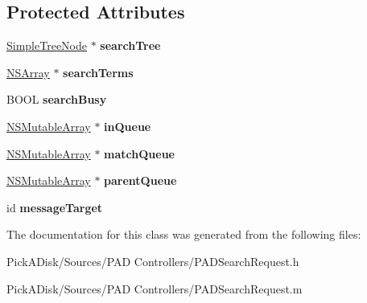 \subsection*{Protected Attributes}
\begin{DoxyCompactItemize}
\item 
\hypertarget{interface_p_a_d_search_term_operation_a9cb714370ce604571ce9d9e484323752}{
\hyperlink{class_simple_tree_node}{SimpleTreeNode} $\ast$ {\bfseries searchTree}}
\label{interface_p_a_d_search_term_operation_a9cb714370ce604571ce9d9e484323752}

\item 
\hypertarget{interface_p_a_d_search_term_operation_aa08f06e64d4f09f6c751c209901f5ca0}{
\hyperlink{class_n_s_array}{NSArray} $\ast$ {\bfseries searchTerms}}
\label{interface_p_a_d_search_term_operation_aa08f06e64d4f09f6c751c209901f5ca0}

\item 
\hypertarget{interface_p_a_d_search_term_operation_a9272906c162c62597bf156d324ec7076}{
BOOL {\bfseries searchBusy}}
\label{interface_p_a_d_search_term_operation_a9272906c162c62597bf156d324ec7076}

\item 
\hypertarget{interface_p_a_d_search_term_operation_a7060bec5dc65de00bda875b593b2b181}{
\hyperlink{class_n_s_mutable_array}{NSMutableArray} $\ast$ {\bfseries inQueue}}
\label{interface_p_a_d_search_term_operation_a7060bec5dc65de00bda875b593b2b181}

\item 
\hypertarget{interface_p_a_d_search_term_operation_a77d89b9f54f1e708d454671a25521a95}{
\hyperlink{class_n_s_mutable_array}{NSMutableArray} $\ast$ {\bfseries matchQueue}}
\label{interface_p_a_d_search_term_operation_a77d89b9f54f1e708d454671a25521a95}

\item 
\hypertarget{interface_p_a_d_search_term_operation_a2287279e77ac99999cd6b819ce4983cd}{
\hyperlink{class_n_s_mutable_array}{NSMutableArray} $\ast$ {\bfseries parentQueue}}
\label{interface_p_a_d_search_term_operation_a2287279e77ac99999cd6b819ce4983cd}

\item 
\hypertarget{interface_p_a_d_search_term_operation_a947e22d4f4355140dc0837c01ce36634}{
id {\bfseries messageTarget}}
\label{interface_p_a_d_search_term_operation_a947e22d4f4355140dc0837c01ce36634}

\end{DoxyCompactItemize}


The documentation for this class was generated from the following files:\begin{DoxyCompactItemize}
\item 
PickADisk/Sources/PAD Controllers/PADSearchRequest.h\item 
PickADisk/Sources/PAD Controllers/PADSearchRequest.m\end{DoxyCompactItemize}
